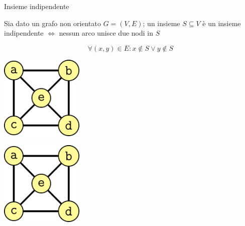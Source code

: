 \begin{frame}{Insieme indipendente}

\vspace{-9pt}
\begin{myboxtitle}
Sia dato un grafo non orientato $G=(V,E)$; un insieme
$S \subseteq V$ è un \alert{insieme indipendente} $\Leftrightarrow$ nessun arco unisce due nodi in $S$

\vspace{-3pt}
\[
\forall (x,y) \in E: x \not \in S \vee y \not \in S
\]
\end{myboxtitle}

\bigskip
\begin{overprint}
\begin{center}
\includegraphics[width=0.3\textwidth,page=1]{independent.pdf}
\end{center}
\begin{center}
\includegraphics[width=0.3\textwidth,page=2]{independent.pdf}
\end{center}
\end{overprint}

\end{frame}


